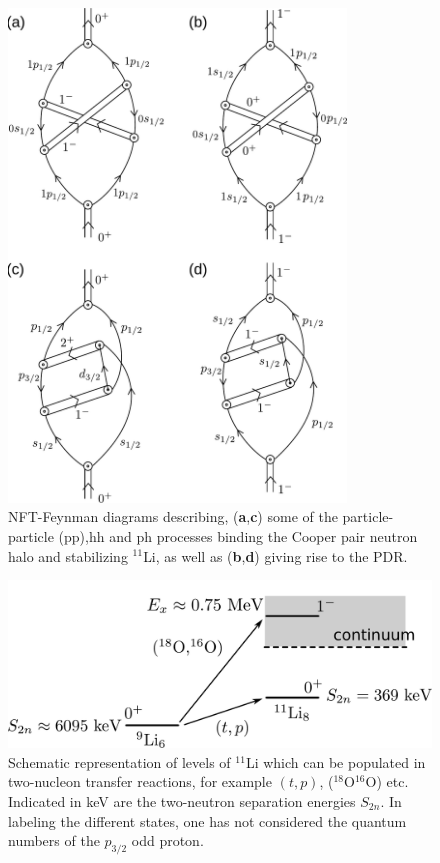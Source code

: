 \begin{subappendices}
\begin{figure}
\includegraphics[width=0.8\textwidth]{C8/figsC8/Nobel40Years-4b.pdf}
\caption{NFT-Feynman diagrams describing, (\textbf{a},\textbf{c}) some of the particle-particle (pp),hh and ph processes binding the Cooper pair neutron halo 
and stabilizing $^{11}$Li, as well as  (\textbf{b},\textbf{d}) giving rise to the PDR.}\label{fig6.I.2}
\end{figure}

\begin{figure}
\includegraphics[width=\textwidth]{C8/figsC8/figa3_newnew.pdf}
\caption{Schematic representation of levels of $^{11}$Li which can be populated  in two-nucleon transfer reactions, for example $(t,p)$, ($^{18}$O$^{16}$O) etc. Indicated in keV are the two-neutron
separation energies $S_{2n}$. In labeling the different states, one has not considered the quantum numbers of the $p_{3/2}$ odd proton. }\label{fig6.I.3} 
\end{figure}


\end{subappendices}
